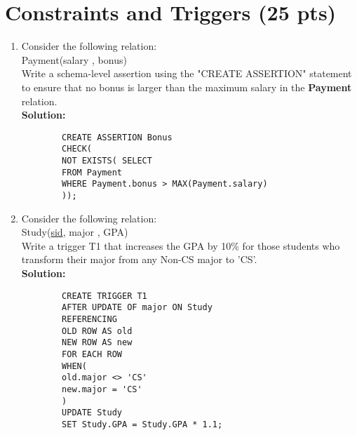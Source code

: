 \documentclass[paper=a4, fontsize=11pt]{scrartcl}
\numberwithin{equation}{section}		%
\numberwithin{figure}{section}			%
\numberwithin{table}{section}				%
\begin{document}
	\section{Constraints and Triggers (25 pts)}
	\begin{enumerate}
		\item Consider the following relation: \\
		Payment(salary , bonus) \\
		Write a schema-level assertion using the "CREATE ASSERTION" statement to ensure that no bonus is larger than the maximum salary in the \textbf{Payment} relation.\\
		\textbf{Solution: }
		\begin{lstlisting}
		CREATE ASSERTION Bonus
		CHECK(
		NOT EXISTS( SELECT
		FROM Payment 
		WHERE Payment.bonus > MAX(Payment.salary)
		));
		\end{lstlisting}
		
		\item Consider the following relation: \\
		Study(\underline{sid}, major , GPA) \\
		Write a trigger T1 that increases the GPA by 10\% for those students who transform their major from any Non-CS major to 'CS'.\\
		\textbf{Solution: }
		\begin{lstlisting}
		CREATE TRIGGER T1
		AFTER UPDATE OF major ON Study
		REFERENCING
		OLD ROW AS old
		NEW ROW AS new
		FOR EACH ROW
		WHEN(
		old.major <> 'CS'
		new.major = 'CS'
		)
		UPDATE Study
		SET Study.GPA = Study.GPA * 1.1;
		
		
		\end{lstlisting}
		
		
		
	\end{enumerate}
	
	
	
	
	
\end{document}
